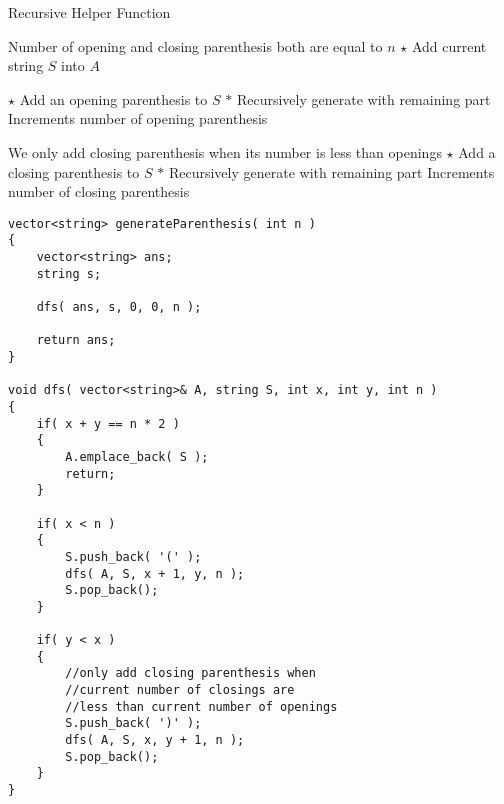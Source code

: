 \begin{algorithm}[H]
\caption{Recursive Helper Function}
\begin{algorithmic}[1]
 \Comment Number of opening and closing parenthesis both are equal to $n$
\State $\star$ Add current string $S$ into $A$
\State \Return
\EndIf
{}
\end{algorithmic}
\end{algorithm}
\begin{algorithm}[H]
\begin{algorithmic}[1]
\State $\star$ Add an opening parenthesis to $S$
\State $\ast$ Recursively generate with remaining part
\State {} \Comment Increments number of opening parenthesis 
\EndIf

 \Comment We only add closing parenthesis when its number is less than openings
\State $\star$ Add a closing parenthesis to $S$
\State $\ast$ Recursively generate with remaining part
\State {} \Comment Increments number of closing parenthesis 
\EndIf
\EndFunction
\end{algorithmic}
\end{algorithm}

\setcounter{lstlisting}{0}
\begin{lstlisting}[style=customc, caption={Backtracking}]
vector<string> generateParenthesis( int n )
{
    vector<string> ans;
    string s;

    dfs( ans, s, 0, 0, n );

    return ans;
}

void dfs( vector<string>& A, string S, int x, int y, int n )
{
    if( x + y == n * 2 )
    {
        A.emplace_back( S );
        return;
    }

    if( x < n )
    {
        S.push_back( '(' );
        dfs( A, S, x + 1, y, n );
        S.pop_back();
    }

    if( y < x )
    {
        //only add closing parenthesis when
        //current number of closings are
        //less than current number of openings
        S.push_back( ')' );
        dfs( A, S, x, y + 1, n );
        S.pop_back();
    }
}

\end{lstlisting}
